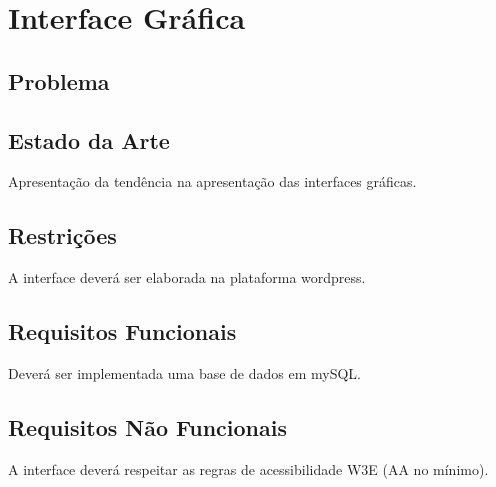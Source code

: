 \chapter{Interface Gráfica}
\section{Problema}
\section{Estado da Arte}
Apresentação da tendência na apresentação das interfaces gráficas.

\section{Restrições}
A interface deverá ser elaborada na plataforma wordpress.

\section{Requisitos Funcionais}
Deverá ser implementada uma base de dados em mySQL.


\section{Requisitos Não Funcionais}
A interface deverá respeitar as regras de acessibilidade W3E (AA no mínimo).

